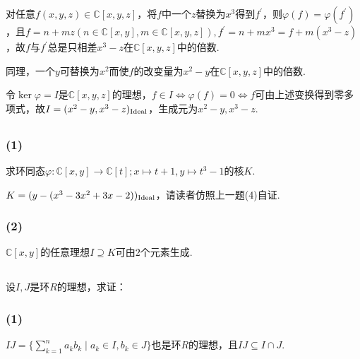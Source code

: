  \jie 对任意$f(x,y,z)\in\mathbb{C}[x,y,z]$，将$f$中一个$z$替换为$x^3$得到$f^{\prime}$，则$\varphi(f)=\varphi(f^{\prime})$，且$f=n+mz (n\in\mathbb{C}[x,y],m\in\mathbb{C}[x,y,z]), f^{\prime}=n+mx^3=f+m(x^3-z)$，故$f$与$f^{\prime}$总是只相差$x^3-z$在$\mathbb{C}[x,y,z]$中的倍数.
 
 同理，一个$y$可替换为$x^2$而使$f$的改变量为$x^2-y$在$\mathbb{C}[x,y,z]$中的倍数.
 
 令$\ker\varphi=I$是$\mathbb{C}[x,y,z]$的理想，$f\in I\Leftrightarrow \varphi(f)=0\Leftrightarrow f$可由上述变换得到零多项式，故$I=(x^2-y,x^3-z)_{\operatorname{Ideal}}$，生成元为$x^2-y, x^3-z$.
 
 \subsection{}
 \subsubsection{(1)}
 求环同态$\varphi: \mathbb{C}[x,y]\rightarrow \mathbb{C}[t]; x\mapsto t+1, y\mapsto t^3-1$的核$K$.
 
 \jie $K=(y-(x^3-3x^2+3x-2))_{\operatorname{Ideal}}$，请读者仿照上一题(4)自证.
 
 \subsubsection{(2)}
 $\mathbb{C}[x,y]$的任意理想$I\supseteq K$可由$2$个元素生成.
 

\subsection{}
设$I,J$是环$R$的理想，求证：
\subsubsection{(1)}
$IJ=\{\sum_{k=1}^na_kb_k\mid a_k\in I, b_k\in J\}$也是环$R$的理想，且$IJ\subseteq I\cap J$.

